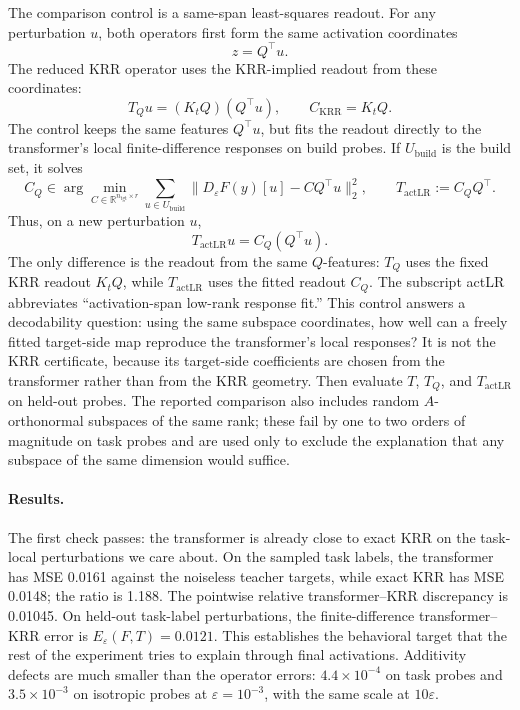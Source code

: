 \documentclass[11pt]{article}
\newcommand{\R}{\mathbb{R}}
\begin{document}
The comparison control is a same-span least-squares readout. For any perturbation \(u\), both
operators first form the same activation coordinates
\[
z=Q^\top u.
\]
The reduced KRR operator uses the KRR-implied readout from these coordinates:
\[
T_Qu=(K_tQ)(Q^\top u),
\qquad C_{\mathrm{KRR}}=K_tQ.
\]
The control keeps the same features \(Q^\top u\), but fits the readout directly to the transformer's
local finite-difference responses on build probes. If \(U_{\mathrm{build}}\) is the build set, it solves
\[
C_Q \in
\arg\min_{C\in\R^{n_{\mathrm{tgt}}\times r}}
\sum_{u\in U_{\mathrm{build}}}
\|D_\varepsilon F(y)[u]-CQ^\top u\|_2^2,
\qquad
T_{\mathrm{actLR}}:=C_QQ^\top.
\]
Thus, on a new perturbation \(u\),
\[
T_{\mathrm{actLR}}u=C_Q(Q^\top u).
\]
The only difference is the readout from the same \(Q\)-features: \(T_Q\) uses the fixed KRR readout
\(K_tQ\), while \(T_{\mathrm{actLR}}\) uses the fitted readout \(C_Q\). The subscript actLR abbreviates
``activation-span low-rank response fit.'' This control answers a decodability question: using the
same subspace coordinates, how well can a freely fitted target-side map reproduce the transformer's
local responses? It is not the KRR certificate, because its target-side coefficients are chosen from
the transformer rather than from the KRR geometry. Then evaluate \(T\), \(T_Q\), and
\(T_{\mathrm{actLR}}\) on held-out probes. The reported comparison also includes random
\(A\)-orthonormal subspaces of the same rank; these fail by one to two orders of magnitude on task
probes and are used only to exclude the explanation that any subspace of the same dimension would
suffice.

\paragraph{Results.}
The first check passes: the transformer is already close to exact KRR on the task-local perturbations
we care about. On the sampled task labels, the transformer has MSE 0.0161 against the noiseless
teacher targets, while exact KRR has MSE 0.0148; the ratio is 1.188. The pointwise relative
transformer--KRR discrepancy is 0.01045. On held-out task-label perturbations, the finite-difference
transformer--KRR error is \(E_\varepsilon(F,T)=0.0121\). This establishes the behavioral target
that the rest of the experiment tries to explain through final activations. Additivity defects are
much smaller than the operator errors: \(4.4\times10^{-4}\) on task probes and \(3.5\times10^{-3}\)
on isotropic probes at \(\varepsilon=10^{-3}\), with the same scale at \(10\varepsilon\).
\end{document}

